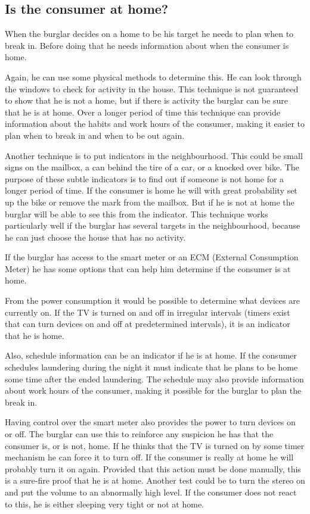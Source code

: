 \subsection{Is the consumer at home?}
When the burglar decides on a home to be his target he needs to plan when to break in.
Before doing that he needs information about when the consumer is home.

Again, he can use some physical methods to determine this.
He can look through the windows to check for activity in the house.
This technique is not guaranteed to show that he is not a home, but if there is activity the burglar can be sure that he is at home.
Over a longer period of time this technique can provide information about the habits and work hours of the consumer, making it easier to plan when to break in and when to be out again.

Another technique is to put indicators in the neighbourhood.
This could be small signs on the mailbox, a can behind the tire of a car, or a knocked over bike.
The purpose of these subtle indicators is to find out if someone is not home for a longer period of time.
If the consumer is home he will with great probability set up the bike or remove the mark from the mailbox.
But if he is not at home the burglar will be able to see this from the indicator.
This technique works particularly well if the burglar has several targets in the neighbourhood, because he can just choose the house that has no activity.

If the burglar has access to the smart meter or an ECM (External Consumption Meter) he has some options that can help him determine if the consumer is at home.

From the power consumption it would be possible to determine what devices are currently on. 
If the TV is turned on and off in irregular intervals (timers exist that can turn devices on and off at predetermined intervals), it is an indicator that he is home.

Also, schedule information can be an indicator if he is at home.
If the consumer schedules laundering during the night it must indicate that he plans to be home some time after the ended laundering.
The schedule may also provide information about work hours of the consumer, making it possible for the burglar to plan the break in.

Having control over the smart meter also provides the power to turn devices on or off.
The burglar can use this to reinforce any suspicion he has that the consumer is, or is not, home.
If he thinks that the TV is turned on by some timer mechanism he can force it to turn off.
If the consumer is really at home he will probably turn it on again.
Provided that this action must be done manually, this is a sure-fire proof that he is at home.
Another test could be to turn the stereo on and put the volume to an abnormally high level.
If the consumer does not react to this, he is either sleeping very tight or not at home.

